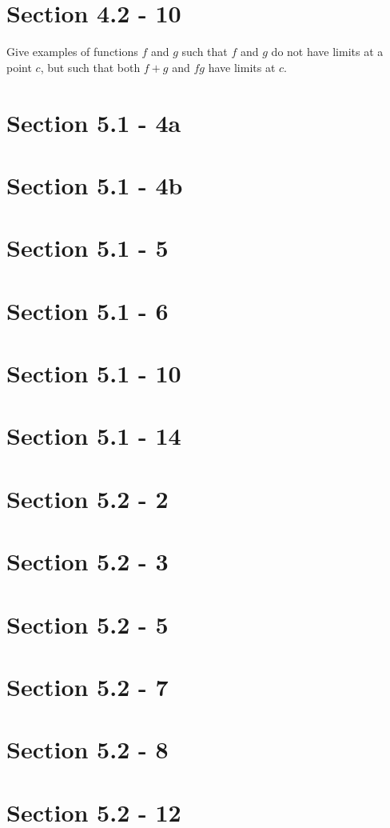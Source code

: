 \section{Section 4.2 - 10}
Give examples of functions $f$ and $g$ such that $f$ and $g$ do not have limits at a point $c$, but such that both $f+g$ and $fg$ have limits at $c$.

\section{Section 5.1 - 4a}
\section{Section 5.1 - 4b}
\section{Section 5.1 - 5}
\section{Section 5.1 - 6}
\section{Section 5.1 - 10}
\section{Section 5.1 - 14}

\section{Section 5.2 - 2}
\section{Section 5.2 - 3}
\section{Section 5.2 - 5}
\section{Section 5.2 - 7}
\section{Section 5.2 - 8}
\section{Section 5.2 - 12}


